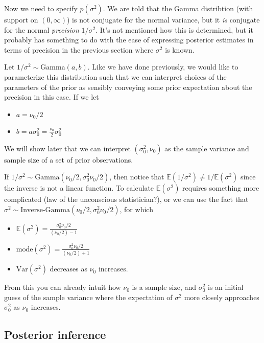 \documentclass[]{article}
\providecommand{\tightlist}{%
  \setlength{\itemsep}{0pt}\setlength{\parskip}{0pt}}
\begin{document}
Now we need to specify \(p(\sigma^2)\). We are told that the Gamma
distribtion (with support on \((0, \infty)\)) is not conjugate for the
normal variance, but it \emph{is} conjugate for the normal
\emph{precision} \(1 / \sigma^2\). It's not mentioned how this is
determined, but it probably has something to do with the ease of
expressing posterior estimates in terms of precision in the previous
section where \(\sigma^2\) is known.

Let \(1 / \sigma^2 \sim \text{Gamma}(a, b)\). Like we have done
previously, we would like to parameterize this distribution such that we
can interpret choices of the parameters of the prior as sensibly
conveying some prior expectation about the precision in this case. If we
let

\begin{itemize}
\tightlist
\item
  \(a = \nu_0 / 2\)
\item
  \(b = a \sigma_0^2 = \frac{\nu_0}{2}\sigma^2_0\)
\end{itemize}

We will show later that we can interpret \((\sigma^2_0, \nu_0)\) as the
sample variance and sample size of a set of prior observations.

If \(1 / \sigma^2 \sim \text{Gamma}(\nu_0 / 2, \sigma^2_0 \nu_0 / 2)\),
then notice that
\(\mathbb{E}(1 / \sigma^2) \neq 1 / \mathbb{E}(\sigma^2)\) since the
inverse is not a linear function. To calculate \(\mathbb{E}(\sigma^2)\)
requires something more complicated (law of the unconscious
statistician?), or we can use the fact that
\(\sigma^2 \sim \text{Inverse-Gamma}(\nu_0/2, \sigma^2_0 \nu_0 / 2)\),
for which

\begin{itemize}
\tightlist
\item
  \(\mathbb{E}(\sigma^2) = \frac{\sigma^2_0 \nu_0 / 2}{(\nu_0 / 2) - 1}\)
\item
  \(\text{mode}(\sigma^2) = \frac{\sigma^2_0 \nu_0 / 2}{(\nu_0 / 2) + 1}\)
\item
  \(\text{Var}(\sigma^2)\) decreases as \(\nu_0\) increases.
\end{itemize}

From this you can already intuit how \(\nu_0\) is a sample size, and
\(\sigma^2_0\) is an initial guess of the sample variance where the
expectation of \(\sigma^2\) more closely approaches \(\sigma^2_0\) as
\(\nu_0\) increases.

\hypertarget{posterior-inference}{%
\subsection{Posterior inference}\label{posterior-inference}}
\end{document}
